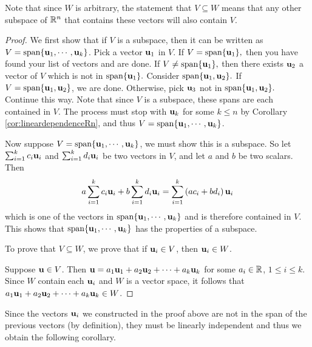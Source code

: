 Note that since $W$ is arbitrary, the statement that $V \subseteq W$ means that any other subspace of $\mathbb{R}^n$ that contains these vectors will also contain $V$. 

\begin{proof}
We first show that if $V$ is a subspace, then it can be written as $V= \mbox{span}\{{\bf u}_{1},\cdots ,{\bf u}_{k}\}$. Pick a vector ${\bf u}_{1}$ in $V$. If $V=
\mbox{span}\{{\bf u}_{1}\} ,$ then you have found your
list of vectors and are done. If $V\neq \mbox{span}\{{\bf u}_{1}\} ,$ then
there exists ${\bf u}_{2}$ a vector of $V$ which is not in $
\mbox{span}\{{\bf u}_{1}\} .$ Consider $\mbox{span}\{
{\bf u}_{1},{\bf u}_{2}\}.$ 
If $V=\mbox{span}\{{\bf u}_{1},{\bf u}_{2}\}$, we are
done. Otherwise, pick ${\bf u}_{3}$ not in $\mbox{span}\{{\bf u}_{1},{\bf u}_{2}\} .$ Continue this way.
Note that since $V $ is a subspace, these spans are each contained in
$V$.  The process must stop with ${\bf u}_{k}$ for some $k\leq n$
by Corollary \ref{cor:lineardependenceRn}, and thus $V=\mbox{span}\{{\bf u}_{1},\cdots ,
{\bf u}_{k}\}$.

Now suppose $V=\mbox{span}\{{\bf u}_{1},\cdots ,
{\bf u}_{k}\}$, we must show this is a subspace. So let $\sum_{i=1}^{k}c_{i}{\bf u}_{i}$ and $
\sum_{i=1}^{k}d_{i}{\bf u}_{i}$ be two vectors in $V$, and let $a$
and $b$ be two scalars. Then 
\begin{equation*}
a \sum_{i=1}^{k}c_{i}{\bf u}_{i}+ b \sum_{i=1}^{k}d_{i}{\bf u}_{i}=
 \sum_{i=1}^{k}\left( a c_{i}+b  d_{i}\right) {\bf u}_{i}
\end{equation*}
which is one of the vectors in $\mbox{span}\{{\bf u}_{1},\cdots ,
{\bf u}_{k}\}$ and is therefore contained in $V$. This shows that $\mbox{span}\{{\bf u}_{1},\cdots ,{\bf u}_{k}\} $ has the properties of a subspace. 

To prove that $V \subseteq W$, we prove that if
${\bf u}_i\in V$, then ${\bf u}_i \in W$.

Suppose ${\bf u}\in V$. 
Then ${\bf u}=a_1{\bf u}_1 + a_2{\bf u}_2 + \cdots + a_k{\bf u}_k$
for some $a_i\in\mathbb{R}$, $1\leq i\leq k$.
Since $W$ contain each ${\bf u}_i$ and $W$ is a vector space, it follows that $ a_1{\bf u}_1 + a_2{\bf u}_2 + \cdots + a_k{\bf u}_k \in W$. 
\end{proof}

Since the vectors ${\bf u}_i$ we constructed in the proof above are not in the span
of the previous vectors (by definition), they must be linearly independent and thus we
obtain the following corollary.

